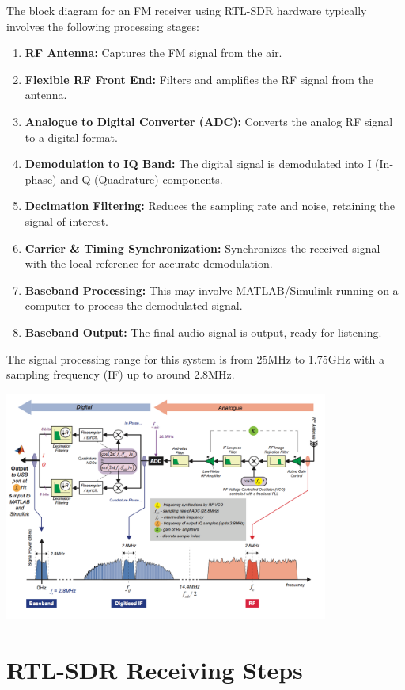 The block diagram for an FM receiver using RTL-SDR hardware typically involves the following processing stages:
\begin{enumerate}
    \item \textbf{RF Antenna:} Captures the FM signal from the air.
    \item \textbf{Flexible RF Front End:} Filters and amplifies the RF signal from the antenna.
    \item \textbf{Analogue to Digital Converter (ADC):} Converts the analog RF signal to a digital format.
    \item \textbf{Demodulation to IQ Band:} The digital signal is demodulated into I (In-phase) and Q (Quadrature) components.
    \item \textbf{Decimation Filtering:} Reduces the sampling rate and noise, retaining the signal of interest.
    \item \textbf{Carrier \& Timing Synchronization:} Synchronizes the received signal with the local reference for accurate demodulation.
    \item \textbf{Baseband Processing:} This may involve MATLAB/Simulink running on a computer to process the demodulated signal.
    \item \textbf{Baseband Output:} The final audio signal is output, ready for listening.
\end{enumerate}
The signal processing range for this system is from 25MHz to 1.75GHz with a sampling frequency (IF) up to around 2.8MHz.
\begin{center}
    \includegraphics[width=0.8\textwidth]{imgs/rtl-sdr.png}
\end{center}

\section*{RTL-SDR Receiving Steps}




